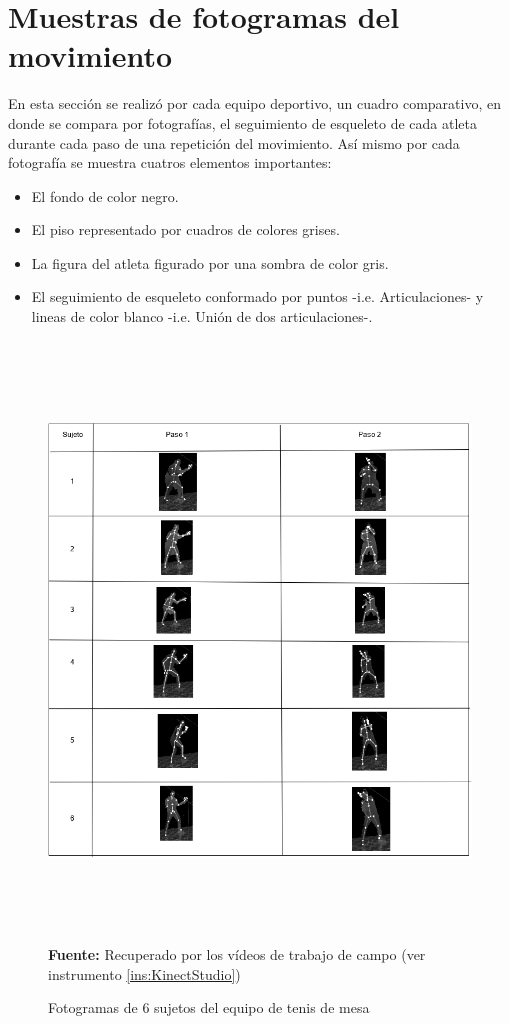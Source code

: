 \section{Muestras de fotogramas del movimiento} \label{res:fotogramas}
En esta secci\'on se realiz\'o por cada equipo deportivo, un cuadro comparativo, en donde se compara por fotograf\'ias, el seguimiento de esqueleto de cada atleta durante cada paso de una repetici\'on del movimiento. As\'i mismo por cada fotograf\'ia se muestra cuatros elementos importantes:
\begin{itemize}
\item El fondo de color negro.
\item El piso representado por cuadros de colores grises.
\item La figura del atleta figurado por una sombra de color gris.
\item El seguimiento de esqueleto conformado por puntos -i.e. Articulaciones- y lineas de color blanco -i.e. Uni\'on de dos articulaciones-.
\end{itemize}
\begin{figure}[H]
	\caption{Fotogramas de 6 sujetos del equipo de tenis de mesa}
	\label{fig:fotogramaTenis}
	\centering
	\includegraphics[width=445px,height=600px]{graphics/resultados/SETenisDeMesa.PNG} \\
	\textbf{Fuente:} Recuperado por los v\'ideos de trabajo de campo (ver instrumento \ref{ins:KinectStudio})
\end{figure}
